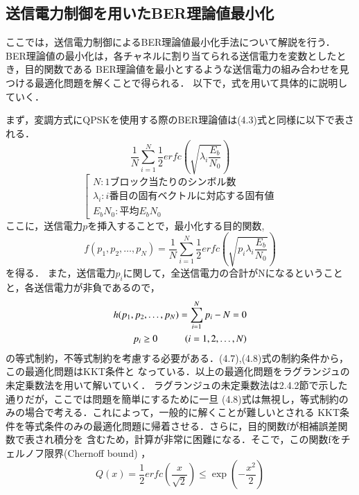 \subsection{送信電力制御を用いたBER理論値最小化}
ここでは，送信電力制御によるBER理論値最小化手法について解説を行う．
BER理論値の最小化は，各チャネルに割り当てられる送信電力を変数としたとき，目的関数である
BER理論値を最小とするような送信電力の組み合わせを見つける最適化問題を解くことで得られる．
以下で，式を用いて具体的に説明していく．

まず，変調方式にQPSKを使用する際のBER理論値は(4.3)式と同様に以下で表される．
\begin{equation}
    \frac{1}{N} \sum_{i=1}^N \frac{1}{2}erfc\left( \sqrt{\lambda_i\frac{E_b}{N_0}} \right)
\end{equation}
\begin{equation}
    \left[
        \begin{array}{l}
            N:1ブロック当たりのシンボル数 \\
            \lambda_i:i番目の固有ベクトルに対応する固有値 \\
            E_bN_0:平均E_bN_0
        \end{array}
    \right. \nonumber
\end{equation}
ここに，送信電力$p$を挿入することで，最小化する目的関数,
\begin{equation}
    f(p_1,p_2,\ldots,p_N) = \frac{1}{N} \sum_{i=1}^N \frac{1}{2}erfc\left( \sqrt{p_i\lambda_i\frac{E_b}{N_0}} \right)
\end{equation}
を得る．
また，送信電力$p_i$に関して，全送信電力の合計がNになるということと，各送信電力が非負であるので，
\begin{eqnarray}
    h(p_1,p_2,\ldots,p_N) = \sum_{i=1}^N p_i-N=0 \\
    p_i \geq 0 \hspace{10mm} (i=1,2,\ldots,N)
\end{eqnarray}
の等式制約，不等式制約を考慮する必要がある．(4.7),(4.8)式の制約条件から，この最適化問題はKKT条件と
なっている．以上の最適化問題をラグランジュの未定乗数法を用いて解いていく．
ラグランジュの未定乗数法は2.4.2節で示した通りだが，ここでは問題を簡単にするために一旦
(4.8)式は無視し，等式制約のみの場合で考える．これによって，一般的に解くことが難しいとされる
KKT条件を等式条件のみの最適化問題に帰着させる．さらに，目的関数fが相補誤差関数で表され積分を
含むため，計算が非常に困難になる．そこで，この関数fをチェルノフ限界(Chernoff bound) \cite{akaiwa}，
\begin{equation}
    Q(x) = \frac{1}{2}erfc\left( \frac{x}{\sqrt{2}} \right) \leq \exp\left( -\frac{x^2}{2} \right)
\end{equation}
